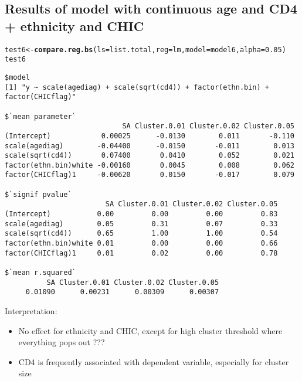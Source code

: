 \documentclass[]{revtex4}\usepackage[]{graphicx}\usepackage[]{color}
\makeatletter
\newcommand{\hlnum}[1]{\textcolor[rgb]{0.686,0.059,0.569}{#1}}%
\newcommand{\hlstd}[1]{\textcolor[rgb]{0.345,0.345,0.345}{#1}}%
\newcommand{\hlkwb}[1]{\textcolor[rgb]{0.69,0.353,0.396}{#1}}%
\newcommand{\hlkwc}[1]{\textcolor[rgb]{0.333,0.667,0.333}{#1}}%
\newcommand{\hlkwd}[1]{\textcolor[rgb]{0.737,0.353,0.396}{\textbf{#1}}}%
\newenvironment{kframe}{%
 \def\at@end@of@kframe{}%
 \ifinner\ifhmode%
  \def\at@end@of@kframe{\end{minipage}}%
  \begin{minipage}{\columnwidth}%
 \fi\fi%
 \def\FrameCommand##1{\hskip\@totalleftmargin \hskip-\fboxsep
 \colorbox{shadecolor}{##1}\hskip-\fboxsep
     \hskip-\linewidth \hskip-\@totalleftmargin \hskip\columnwidth}%
 \MakeFramed {\advance\hsize-\width
   \@totalleftmargin\z@ \linewidth\hsize
   \@setminipage}}%
 {\par\unskip\endMakeFramed%
 \at@end@of@kframe}
\newenvironment{knitrout}{}{} %
\makeatother
\begin{document}
\subsection*{Results of model with continuous age and CD4 + ethnicity and CHIC}
\begin{knitrout}
\color{fgcolor}\begin{kframe}
\begin{alltt}
\hlstd{test6} \hlkwb{<-} \hlkwd{compare.reg.bs}\hlstd{(}\hlkwc{ls} \hlstd{= list.total,} \hlkwc{reg} \hlstd{= lm,} \hlkwc{model} \hlstd{= model6,} \hlkwc{alpha} \hlstd{=} \hlnum{0.05}\hlstd{)}
\hlstd{test6}
\end{alltt}
\begin{verbatim}
$model
[1] "y ~ scale(agediag) + scale(sqrt(cd4)) + factor(ethn.bin) + factor(CHICflag)"

$`mean parameter`
                            SA Cluster.0.01 Cluster.0.02 Cluster.0.05
(Intercept)            0.00025      -0.0130        0.011       -0.110
scale(agediag)        -0.04400      -0.0150       -0.011        0.013
scale(sqrt(cd4))       0.07400       0.0410        0.052        0.021
factor(ethn.bin)white -0.00160       0.0045        0.008        0.062
factor(CHICflag)1     -0.00620       0.0150       -0.017        0.079

$`signif pvalue`
                        SA Cluster.0.01 Cluster.0.02 Cluster.0.05
(Intercept)           0.00         0.00         0.00         0.83
scale(agediag)        0.05         0.31         0.07         0.33
scale(sqrt(cd4))      0.65         1.00         1.00         0.54
factor(ethn.bin)white 0.01         0.00         0.00         0.66
factor(CHICflag)1     0.01         0.02         0.00         0.78

$`mean r.squared`
          SA Cluster.0.01 Cluster.0.02 Cluster.0.05 
     0.01090      0.00231      0.00309      0.00307 
\end{verbatim}
\end{kframe}
\end{knitrout}
Interpretation: 
\begin{itemize}
\item No effect for ethnicity and CHIC, except for high cluster threshold where everything pops out ???
\item CD4 is frequently associated with dependent variable, especially for cluster size
\end{itemize}
\end{document}
